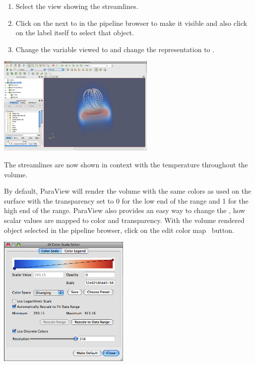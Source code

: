 \begin{enumerate}
\item Select the view showing the streamlines.
\item Click on the \eyeballg next to  in the
  pipeline browser to make it visible and also click on the label
   itself to select that object.
\item Change the variable viewed to  and change the
  representation to .
\end{enumerate}

\begin{inlinefig}
  \includegraphics[width=3in]{images/VolumeRender2}
\end{inlinefig}

The streamlines are now shown in context with the temperature throughout
the volume.

By default, ParaView will render the volume with the same colors as used on
the surface with the transparency set to 0 for the low end of the range and
1 for the high end of the range.  ParaView also provides an easy way to
change the , how scalar values are mapped to
color and transparency.  With the volume rendered object selected in the
pipeline browser, click on the edit color map~ button.

\begin{inlinefig}
  \includegraphics[width=2.5in]{images/ColorScaleEditor}
\end{inlinefig}

